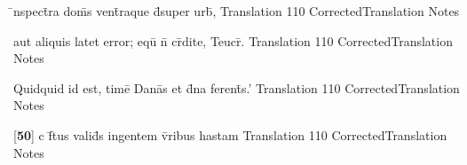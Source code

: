 \latline
  {\={\macron {\i}}nspect\={}ra dom\={}s vent\={}raque d\={}super urb\={\macron {\i}},}
  { Translation }
  {110}
  { CorrectedTranslation }
  { Notes }


\latline
  {aut aliquis latet error; equ\={} n\={} cr\={}dite, Teucr\={\macron {\i}}.}
  { Translation }
  {110}
  { CorrectedTranslation }
  { Notes }


\latline
  {Quidquid id est, time\={} Dana\={}s et d\={}na ferent\={\macron {\i}}s.'}
  { Translation }
  {110}
  { CorrectedTranslation }
  { Notes }


\latline
  {[\textbf{50}] c f\={}tus valid\={\macron {\i}}s ingentem v\={\macron {\i}}ribus hastam}
  { Translation }
  {110}
  { CorrectedTranslation }
  { Notes }


